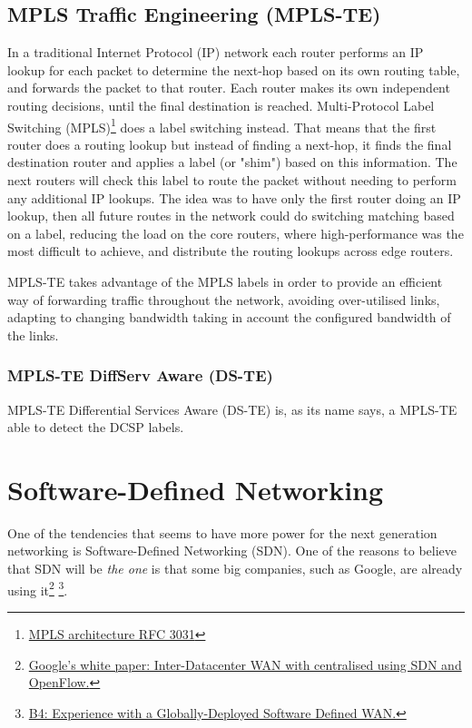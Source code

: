 \subsection{MPLS Traffic Engineering (MPLS-TE)}
\label{sec:mpls-te}
In a traditional Internet Protocol (IP) network each router performs an IP lookup for each packet to determine the next-hop based on its own routing table, and forwards the packet to that router. Each router makes its own independent routing decisions, until the final destination is reached.
Multi-Protocol Label Switching (MPLS)\footnote{\href{http://www.ietf.org/rfc/rfc3031.txt}{MPLS architecture RFC 3031}} does a label switching instead. That means that the first router does a routing lookup but instead of finding a next-hop, it finds the final destination router and applies a label (or "shim") based on this information. The next routers will check this label to route the packet without needing to perform any additional IP lookups. The idea was to have only the first router doing an IP lookup, then all future routes in the network could do switching matching based on a label, reducing the load on the core routers, where high-performance was the most difficult to achieve, and distribute the routing lookups across edge routers.

MPLS-TE takes advantage of the MPLS labels in order to provide an efficient way of forwarding traffic throughout the network, avoiding over-utilised links, adapting to changing bandwidth taking in account the configured bandwidth of the links.

\subsubsection{MPLS-TE DiffServ Aware (DS-TE)}

MPLS-TE Differential Services Aware (DS-TE) is, as its name says, a MPLS-TE able to detect the DCSP labels.

\section{Software-Defined Networking}
\label{sec:sdn}

One of the tendencies that seems to have more power for the next generation networking is Software-Defined Networking (SDN). One of the reasons to believe that SDN will be \emph{the one} is that some big companies, such as Google, are already using it\footnote{\href{http://goo.gl/F6sBR}{Google's white paper: Inter-Datacenter WAN with centralised using SDN and OpenFlow.}} \footnote{\href{http://cseweb.ucsd.edu/~vahdat/papers/b4-sigcomm13.pdf}{B4: Experience with a Globally-Deployed Software Defined WAN.}}.\\

